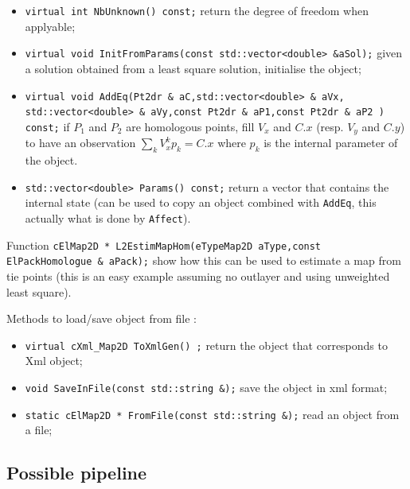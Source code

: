 \begin{itemize}
    \item {\tt virtual int   NbUnknown() const;} return the degree of freedom when applyable;

    \item {\tt   virtual void  InitFromParams(const std::vector<double> \&aSol);} given a solution obtained
          from a least square solution, initialise the object; 

    \item {\tt     virtual void  AddEq(Pt2dr \& aC,std::vector<double> \& aVx,
                   std::vector<double> \& aVy,const Pt2dr \& aP1,const Pt2dr \& aP2 ) const;}
          if $P_1$ and $P_2$ are homologous points, fill  $V_x$ and $C.x$ (resp. $V_y$ and $C.y$) 
          to have an observation $ \sum\limits_k V_x^k p_k = C.x $ where $p_k$  is the internal parameter
          of the object.

    \item {\tt   std::vector<double> Params() const;} return a vector that contains the internal
          state  (can be used to copy an object combined with {\tt AddEq}, this actually what is
          done by {\tt Affect}).
 
\end{itemize}

Function {\tt cElMap2D * L2EstimMapHom(eTypeMap2D aType,const ElPackHomologue \& aPack);} show how this
can be used to estimate a map from tie points (this is an easy example assuming no outlayer and
using unweighted least square).


Methods to load/save object from file :

\begin{itemize}
   \item {\tt virtual cXml\_Map2D    ToXmlGen() ;} return the \CPP object that corresponds to  
         Xml object;

   \item {\tt void  SaveInFile(const std::string \&);} save the object in xml format;

   \item {\tt  static cElMap2D * FromFile(const std::string \&);} read an object from a file;
\end{itemize}


\subsection{Possible pipeline}

